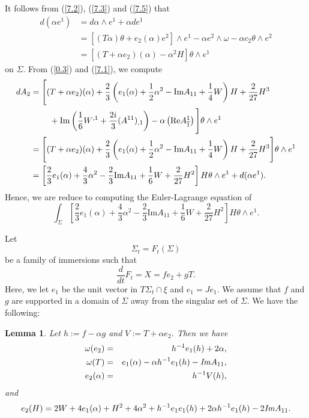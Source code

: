 \documentclass{amsart}
\newtheorem{lem}[theorem]{Lemma}
\theoremstyle{Corollary}
\numberwithin{equation}{section}
\begin{document}
It follows from (\ref{7.2}), (\ref{7.3}) and (\ref{7.5}) that
\begin{equation}\label{7.7}
\begin{split}
d(\alpha e^1)
&=d\alpha\wedge e^1+\alpha de^1\\
&=[(T\alpha)\theta+e_2(\alpha)e^2]\wedge e^1-\alpha e^2\wedge \omega -\alpha c_2\theta\wedge e^2\\
&=[(T+\alpha e_2)(\alpha)-\alpha^2H]\theta\wedge e^1
\end{split}
\end{equation}
on $\Sigma$. 
From (\ref{0.3})
and (\ref{7.1}), 
we compute 
\begin{equation}\label{7.0}
\begin{split}
dA_2 &=\Bigg[(T+\alpha e_2)(\alpha)+\frac{2}{3}\left(e_1(\alpha)+\frac{1}{2}\alpha^2-\mbox{Im} A_{11}+\frac{1}{4}W\right)H+\frac{2}{27}H^3\\
&\hspace{8mm}+\mbox{Im}\left(\frac{1}{6}W^{,1}+\frac{2i}{3}(A^{11})_{,1}\right)-\alpha\left(\mbox{Re} A^1_{\overline{1}}\right)\Bigg]\theta\wedge e^1\\
&=\Bigg[(T+\alpha e_2)(\alpha)+\frac{2}{3}\left(e_1(\alpha)+\frac{1}{2}\alpha^2-\mbox{Im} A_{11}+\frac{1}{4}W\right)H+\frac{2}{27}H^3\Bigg]\theta\wedge e^1\\
&=\left[\frac{2}{3}e_1(\alpha)+\frac{4}{3}\alpha^2-\frac{2}{3}\mbox{Im} A_{11}
+\frac{1}{6}W+\frac{2}{27}H^2\right]H\theta\wedge e^1+d(\alpha e^1).
\end{split}
\end{equation}
Hence, we are reduce to computing the Euler-Lagrange equation of 
$$\int_\Sigma \left[\frac{2}{3}e_1(\alpha)+\frac{4}{3}\alpha^2-\frac{2}{3}\mbox{Im} A_{11}
+\frac{1}{6}W+\frac{2}{27}H^2\right]H\theta\wedge e^1.$$

Let 
$$\Sigma_t=F_t(\Sigma)$$
be a family of immersions such that 
\begin{equation}\label{7.8}
\frac{d}{dt}F_t=X=fe_2+gT.
\end{equation}
Here, we let $e_1$ be the unit vector in $T\Sigma_t\cap\xi$
and $e_1=Je_1$. 
We assume that 
$f$ and $g$ are supported in a domain of $\Sigma$ away from the singular set of $\Sigma$. 
We have the following: 




\begin{lem}\label{lem7.1}
Let $h:=f-\alpha g$ and $V:=T+\alpha e_2$. 
Then we have 
\begin{eqnarray}
\label{7.10}\omega(e_2)&=&h^{-1}e_1(h)+2\alpha,\\
\label{7.11}\omega(T)&=&e_1(\alpha)-\alpha h^{-1}e_1(h)-\mbox{\emph{Im}}A_{11},\\
\label{7.12}e_2(\alpha)&=&h^{-1}V(h),
\end{eqnarray}  
and 
\begin{equation}\label{7.13}
e_2(H)=2W+4e_1(\alpha)+H^2+4\alpha^2+h^{-1}e_1e_1(h)
+2\alpha h^{-1}e_1(h)-2\mbox{\emph{Im}}A_{11}.
\end{equation}
\end{lem}
\end{document}
